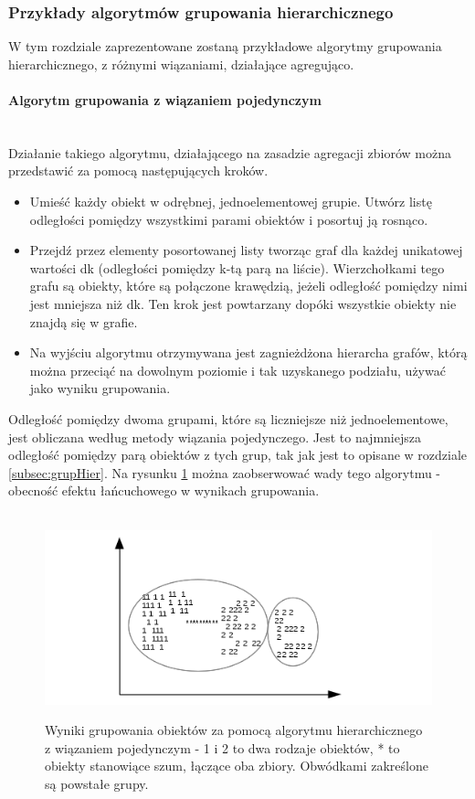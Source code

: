 \documentclass{article}
\newcommand{\myparagraph}[1]{\paragraph{#1}\mbox{}\\}
\begin{document}
\subsubsection{Przykłady algorytmów grupowania hierarchicznego}

W tym rozdziale zaprezentowane zostaną przykładowe algorytmy grupowania hierarchicznego, z różnymi wiązaniami, działające agregująco. 

\myparagraph{Algorytm grupowania z wiązaniem pojedynczym}

Działanie takiego algorytmu, działającego na zasadzie agregacji zbiorów można przedstawić za pomocą następujących kroków.

\begin{itemize}
	\item Umieść każdy obiekt w odrębnej, jednoelementowej grupie. Utwórz listę odległości pomiędzy wszystkimi parami obiektów i posortuj ją rosnąco.
	\item Przejdź przez elementy posortowanej listy tworząc graf dla każdej unikatowej wartości dk (odległości pomiędzy k-tą parą na liście). Wierzchołkami tego grafu są obiekty, które są połączone krawędzią, jeżeli odległość pomiędzy nimi jest mniejsza niż dk. Ten krok jest powtarzany dopóki wszystkie obiekty nie znajdą się w grafie.
	\item Na wyjściu algorytmu otrzymywana jest zagnieżdżona hierarcha grafów, którą można przeciąć na dowolnym poziomie i tak uzyskanego podziału, używać jako wyniku grupowania.
\end{itemize}

Odległość pomiędzy dwoma grupami, które są liczniejsze niż jednoelementowe, jest obliczana według metody wiązania pojedynczego. Jest to najmniejsza odległość pomiędzy parą obiektów z tych grup, tak jak jest to opisane w rozdziale \ref{subsec:grupHier}. Na rysunku \ref{fig:grupHPng} można zaobserwować wady tego algorytmu - obecność efektu łańcuchowego w wynikach grupowania.

\begin{figure} \
	\centering
	\includegraphics[]{hierarchiczneGrupowanie.png}
	\caption{Wyniki grupowania obiektów za pomocą algorytmu hierarchicznego z wiązaniem pojedynczym - 1 i 2 to dwa rodzaje obiektów, * to obiekty stanowiące szum, łączące oba zbiory. Obwódkami zakreślone są powstałe grupy.}
	\label{fig:grupHPng}
\end{figure}
\end{document}
